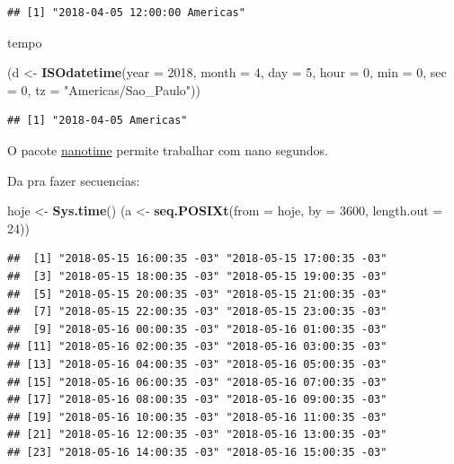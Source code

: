 \documentclass[]{book}
\newenvironment{Shaded}{\begin{snugshade}}{\end{snugshade}}
\newcommand{\KeywordTok}[1]{\textcolor[rgb]{0.13,0.29,0.53}{\textbf{#1}}}
\newcommand{\DataTypeTok}[1]{\textcolor[rgb]{0.13,0.29,0.53}{#1}}
\newcommand{\DecValTok}[1]{\textcolor[rgb]{0.00,0.00,0.81}{#1}}
\newcommand{\StringTok}[1]{\textcolor[rgb]{0.31,0.60,0.02}{#1}}
\newcommand{\NormalTok}[1]{#1}
\begin{document}
\begin{verbatim}
## [1] "2018-04-05 12:00:00 Americas"
\end{verbatim}

tempo

\begin{Shaded}
\begin{Highlighting}[]
\NormalTok{(d <-}\StringTok{ }\KeywordTok{ISOdatetime}\NormalTok{(}\DataTypeTok{year =} \DecValTok{2018}\NormalTok{, }\DataTypeTok{month =} \DecValTok{4}\NormalTok{, }\DataTypeTok{day =} \DecValTok{5}\NormalTok{, }\DataTypeTok{hour =} \DecValTok{0}\NormalTok{, }\DataTypeTok{min =} \DecValTok{0}\NormalTok{, }\DataTypeTok{sec =} \DecValTok{0}\NormalTok{,}
                  \DataTypeTok{tz =} \StringTok{"Americas/Sao_Paulo"}\NormalTok{))}
\end{Highlighting}
\end{Shaded}

\begin{verbatim}
## [1] "2018-04-05 Americas"
\end{verbatim}

O pacote \href{https://github.com/eddelbuettel/nanotime}{nanotime}
permite trabalhar com nano segundos.

Da pra fazer secuencias:

\begin{Shaded}
\begin{Highlighting}[]
\NormalTok{hoje <-}\StringTok{ }\KeywordTok{Sys.time}\NormalTok{()}
\NormalTok{(a <-}\StringTok{ }\KeywordTok{seq.POSIXt}\NormalTok{(}\DataTypeTok{from =}\NormalTok{ hoje, }\DataTypeTok{by =} \DecValTok{3600}\NormalTok{, }\DataTypeTok{length.out =} \DecValTok{24}\NormalTok{))}
\end{Highlighting}
\end{Shaded}

\begin{verbatim}
##  [1] "2018-05-15 16:00:35 -03" "2018-05-15 17:00:35 -03"
##  [3] "2018-05-15 18:00:35 -03" "2018-05-15 19:00:35 -03"
##  [5] "2018-05-15 20:00:35 -03" "2018-05-15 21:00:35 -03"
##  [7] "2018-05-15 22:00:35 -03" "2018-05-15 23:00:35 -03"
##  [9] "2018-05-16 00:00:35 -03" "2018-05-16 01:00:35 -03"
## [11] "2018-05-16 02:00:35 -03" "2018-05-16 03:00:35 -03"
## [13] "2018-05-16 04:00:35 -03" "2018-05-16 05:00:35 -03"
## [15] "2018-05-16 06:00:35 -03" "2018-05-16 07:00:35 -03"
## [17] "2018-05-16 08:00:35 -03" "2018-05-16 09:00:35 -03"
## [19] "2018-05-16 10:00:35 -03" "2018-05-16 11:00:35 -03"
## [21] "2018-05-16 12:00:35 -03" "2018-05-16 13:00:35 -03"
## [23] "2018-05-16 14:00:35 -03" "2018-05-16 15:00:35 -03"
\end{verbatim}
\end{document}
